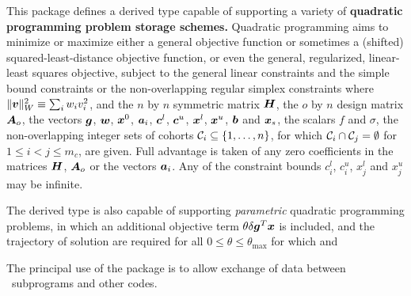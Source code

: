 \documentclass{galahad}
\begin{document}
\galheader


\galsummary
This package defines a derived type capable of supporting
a variety of {\bf quadratic programming problem storage schemes.}
Quadratic programming aims to minimize or maximize either
a general objective function
or sometimes a (shifted) squared-least-distance objective function,
or even the general, regularized, linear-least squares objective,
subject to the general linear constraints
and the simple bound constraints
or the non-overlapping regular simplex constraints
where $\|{\bm{v}}\|_W^2 \equiv \sum_i w_i v_i^2$, and
the $n$ by $n$ symmetric matrix ${\bm{H}}$, the  $o$ by $n$ 
design matrix ${\bm{A}}_o$, the vectors ${\bm{g}}$, ${\bm{w}}$, ${\bm{x}}^{0}$,
${\bm{a}}_{i}$, ${\bm{c}}^{l}$, ${\bm{c}}^{u}$, ${\bm{x}}^{l}$, ${\bm{x}}^{u}$, ${\bm{b}}$
and ${\bm{x}}_s$, the scalars $f$ and $\sigma$, the non-overlapping
integer sets of cohorts $\calC_i \subseteq \{1,\ldots,n\}$, for which
$\calC_i \cap \calC_j = \emptyset$ for $1 \leq i < j \leq m_c$,
are given.
Full advantage is taken of any zero coefficients in the matrices 
${\bm{H}}$, ${\bm{A}}_o$ or the vectors ${\bm{a}}_{i}$.
Any of the constraint bounds $c_{i}^{l}$, $c_{i}^{u}$,
$x_{j}^{l}$ and $x_{j}^{u}$ may be infinite.

The derived type is also capable of supporting {\em parametric}
quadratic programming problems, in which an additional objective
term $\theta \delta {\bm{g}}^T {\bm{x}}$ is included, and the trajectory of
solution are required for all $0 \leq \theta \leq \theta_{\max}$
for which
and

The principal use of the package is to allow exchange of data between
\galahad\ subprograms and other codes.

\end{document}
